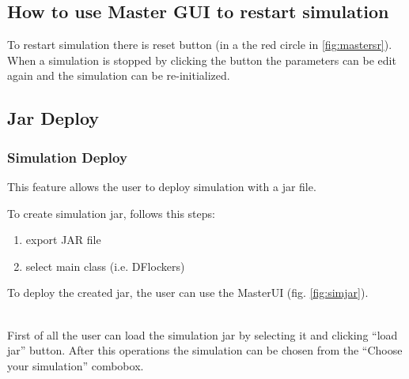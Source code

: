 \documentclass{article}
\begin{document}
\subsection{How to use Master GUI to restart simulation}
To restart simulation there is reset button (in a the red circle in \ref{fig:mastersr}). When a simulation is stopped by clicking the button the parameters can be edit again and the simulation can be re-initialized.
\begin{figure}[h]
\end{figure}
\subsection{Jar Deploy}
\subsubsection{Simulation Deploy}
This feature allows the user to deploy simulation with a jar file.\\
\begin{figure}[h]
\end{figure}
To create simulation jar, follows this steps:
\begin{enumerate} 
  \item export JAR file
  \item select main class (i.e. DFlockers)
\end{enumerate}
To deploy the created jar, the user can use the MasterUI (fig.
\ref{fig:simjar}).
\begin{figure}[h]
\end{figure}\\
First of all the user can load the simulation jar by selecting it and clicking
``load jar'' button. After this operations the simulation can be chosen from the
``Choose your simulation'' combobox.
\end{document}
